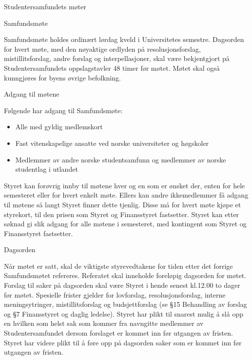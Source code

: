 \begin{lovkapittel}{Studentersamfundets møter}

  \begin{lovparagraf}{Samfundsmøte}
  
Samfundsmøte holdes ordinært lørdag kveld i Universitetes semestre. Dagsorden for hvert møte, med den nøyaktige
ordlyden på resolusjonsforslag, mistillitsforslag, andre forslag og interpellasjoner, skal være bekjentgjort på
Studentersamfundets oppslagstavler 48 timer før møtet. Møtet skal også kunngjøres for byens øvrige befolkning.
   
   \end{lovparagraf}
   
   \begin{lovparagraf}{Adgang til møtene}
   
Følgende har adgang til Samfundsmøte:

\begin{itemize}
  \item Alle med gyldig medlemskort
  \item Fast vitenskapelige ansatte ved norske universiteter og høgskoler
  \item Medlemmer av andre norske studentsamfunn og medlemmer av norske studentlag i utlandet
\end{itemize}

Styret kan forøvrig innby til møtene hver og en som er ønsket der, enten for hele semesteret eller for hvert enkelt
møte. Ellers kan andre ikkemedlemmer få adgang til møtene så langt Styret finner dette tjenlig. Disse må for hvert
møte kjøpe et styrekort, til den prisen som Styret og Finansstyret fastsetter. Styret kan etter søknad gi slik adgang for
alle møtene i semesteret, med kontingent som Styret og Finansstyret fastsetter.

  \end{lovparagraf}
  
  \begin{lovparagraf}{Dagsorden}

Når møtet er satt, skal de viktigste styrevedtakene for tiden etter det forrige Samfundsmøtet refereres. Referatet skal
inneholde foreløpig dagsorden for møtet. Forslag til saker på dagsorden skal være Styret i hende senest kl.12.00 to
dager før møtet. Spesielle frister gjelder for lovforslag, resolusjonsforslag, interne meningsytringer, mistillitsforslag
og budsjettforslag (se §15 Behandling av forslag og §7 Finansstyret og daglig ledelse). Styret har plikt til snarest
mulig å slå opp en hvilken som helst sak som kommer fra navngitte medlemmer av Studentersamfundet dersom
forslaget er kommet inn før utgangen av fristen. Styret har videre plikt til å føre opp på dagsorden saker som er
kommet inn før utgangen av fristen.


\end{lovparagraf}
\end{lovkapittel}
